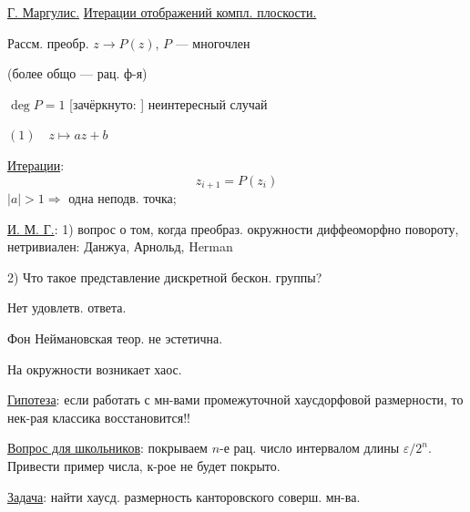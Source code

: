 


\underline{Г. Маргулис.}
\underline{Итерации отображений компл. плоскости.}

Рассм. преобр. $z\to P(z)$, $P$ — многочлен

(более общо — рац. ф-я)

$\operatorname{deg}P=1$
[зачёркнуто: ]
неинтересный случай

$(1)\quad z\mapsto az+b$

\underline{Итерации}:
\begin{equation*}
z_{i+1}=P(z_i)
\end{equation*}
$|a|>1\Rightarrow$ одна неподв. точка;


\begin{center}
\end{center}

\underline{И. М. Г.}: 1) вопрос о том, когда преобраз. окружности диффеоморфно повороту,
нетривиален: Данжуа, Арнольд, Herman

2) Что такое представление дискретной бескон. группы?

Нет удовлетв. ответа.

Фон Неймановская теор. не эстетична.

На окружности возникает хаос.

\underline{Гипотеза}: если работать с мн-вами промежуточной хаусдорфовой
размерности, то нек-рая классика восстановится!!

\underline{Вопрос для школьников}: покрываем $n$-е рац. число интервалом
длины $\varepsilon/2^n$. Привести пример числа, к-рое не будет покрыто.

\underline{Задача}: найти хаусд. размерность канторовского соверш. мн-ва.

